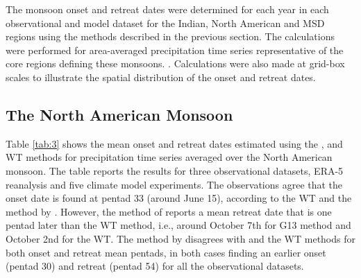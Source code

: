 The monsoon onset and retreat dates were determined for each year in each observational and model dataset for the Indian, North American and MSD regions using the methods described in the previous section. The calculations were performed for area-averaged precipitation time series representative of the core regions defining these monsoons.  . Calculations were also made at grid-box scales to illustrate the spatial distribution of the onset and retreat dates. 


\subsection{The North American Monsoon}






Table \ref{tab:3} shows the mean onset and retreat dates estimated using the ,  and WT methods for precipitation time series averaged over the North American monsoon.
The table reports the results for three observational datasets, ERA-5 reanalysis and five climate model experiments.
The observations  agree that the onset date is found at pentad 33 (around June 15), according to the WT and the method by .
However, the method of  reports a mean retreat date that is one pentad later than the WT method, i.e., around October 7th for G13 method and October 2nd for the WT.
The method by  disagrees with  and the WT methods for both onset and retreat mean pentads, in both cases finding an earlier onset (pentad 30) and retreat (pentad 54) for all the observational datasets. 


